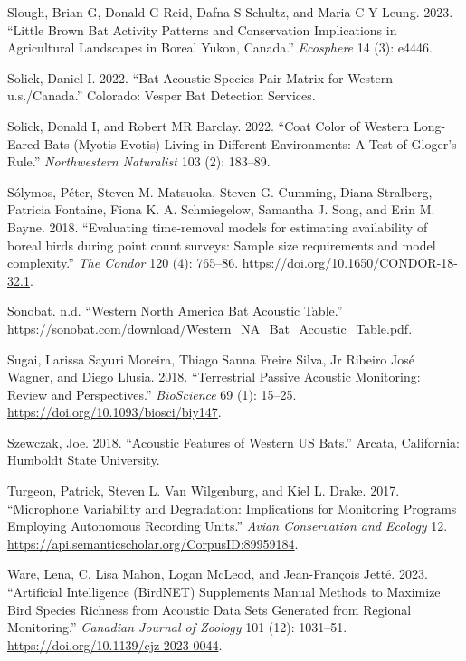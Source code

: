 \documentclass[
  letterpaper,
  DIV=11,
  numbers=noendperiod,
  oneside]{scrartcl}
\newlength{\cslhangindent}
\newenvironment{CSLReferences}[2] %
 {\begin{list}{}{%
  \setlength{\itemindent}{0pt}
  \setlength{\leftmargin}{0pt}
  \setlength{\parsep}{0pt}
  \ifodd #1
   \setlength{\leftmargin}{\cslhangindent}
   \setlength{\itemindent}{-1\cslhangindent}
  \fi
  \setlength{\itemsep}{#2\baselineskip}}}
 {\end{list}}
\begin{document}
\begin{CSLReferences}{1}{0}
Slough, Brian G, Donald G Reid, Dafna S Schultz, and Maria C-Y Leung.
2023. {``Little Brown Bat Activity Patterns and Conservation
Implications in Agricultural Landscapes in Boreal Yukon, Canada.''}
\emph{Ecosphere} 14 (3): e4446.

Solick, Daniel I. 2022. {``Bat Acoustic Species-Pair Matrix for Western
u.s./Canada.''} Colorado: Vesper Bat Detection Services.

Solick, Donald I, and Robert MR Barclay. 2022. {``Coat Color of Western
Long-Eared Bats (Myotis Evotis) Living in Different Environments: A Test
of Gloger's Rule.''} \emph{Northwestern Naturalist} 103 (2): 183--89.

Sólymos, Péter, Steven M. Matsuoka, Steven G. Cumming, Diana Stralberg,
Patricia Fontaine, Fiona K. A. Schmiegelow, Samantha J. Song, and Erin
M. Bayne. 2018. {``{Evaluating time-removal models for estimating
availability of boreal birds during point count surveys: Sample size
requirements and model complexity}.''} \emph{The Condor} 120 (4):
765--86. \url{https://doi.org/10.1650/CONDOR-18-32.1}.

Sonobat. n.d. {``Western North America Bat Acoustic Table.''}
\url{https://sonobat.com/download/Western_NA_Bat_Acoustic_Table.pdf}.

Sugai, Larissa Sayuri Moreira, Thiago Sanna Freire Silva, Jr Ribeiro
José Wagner, and Diego Llusia. 2018. {``{Terrestrial Passive Acoustic
Monitoring: Review and Perspectives}.''} \emph{BioScience} 69 (1):
15--25. \url{https://doi.org/10.1093/biosci/biy147}.

Szewczak, Joe. 2018. {``Acoustic Features of Western US Bats.''} Arcata,
California: Humboldt State University.

Turgeon, Patrick, Steven L. Van Wilgenburg, and Kiel L. Drake. 2017.
{``Microphone Variability and Degradation: Implications for Monitoring
Programs Employing Autonomous Recording Units.''} \emph{Avian
Conservation and Ecology} 12.
\url{https://api.semanticscholar.org/CorpusID:89959184}.

Ware, Lena, C. Lisa Mahon, Logan McLeod, and Jean-François Jetté. 2023.
{``Artificial Intelligence (BirdNET) Supplements Manual Methods to
Maximize Bird Species Richness from Acoustic Data Sets Generated from
Regional Monitoring.''} \emph{Canadian Journal of Zoology} 101 (12):
1031--51. \url{https://doi.org/10.1139/cjz-2023-0044}.

\end{CSLReferences}
\end{document}
